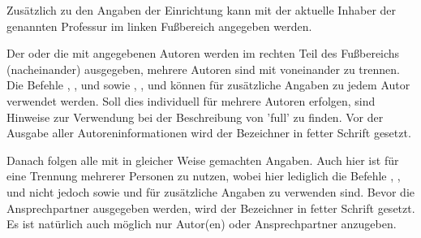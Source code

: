 \begin{DeclareEntity}{}
\begin{Declaration}
  {}
\printdeclarationlist

Zusätzlich zu den Angaben der Einrichtung kann mit  der 
aktuelle Inhaber der genannten Professur im linken Fußbereich angegeben werden.
\end{Declaration}

\begin{Declaration}
  {}
\begin{Declaration}
  {}
\begin{Declaration}
  {}
\begin{Declaration}
  {}
\begin{Declaration}
  {}
\begin{Declaration}
  {}
\begin{Declaration}
  {}
\begin{Declaration}
  {}
\printdeclarationlist

Der oder die mit  angegebenen Autoren werden im rechten Teil des 
Fußbereichs (nacheinander) ausgegeben, mehrere Autoren sind mit  
voneinander zu trennen. Die Befehle , , 
 und  sowie , , 
und  können für zusätzliche Angaben zu jedem Autor verwendet 
werden. Soll dies individuell für mehrere Autoren erfolgen, sind Hinweise zur 
Verwendung bei der Beschreibung von 'full' zu finden. Vor der 
Ausgabe aller Autoreninformationen wird der Bezeichner  in 
fetter Schrift gesetzt. 

Danach folgen alle mit  in gleicher Weise gemachten 
Angaben. Auch hier ist  für eine Trennung mehrerer Personen zu 
nutzen, wobei hier lediglich die Befehle , , 
 und  nicht jedoch  sowie 
 und  für zusätzliche Angaben zu verwenden 
sind. Bevor die Ansprechpartner ausgegeben werden, wird der Bezeichner 
 in fetter Schrift gesetzt. Es ist natürlich auch 
möglich nur Autor(en) oder Ansprechpartner anzugeben.
\end{Declaration}
\end{Declaration}
\end{Declaration}
\end{Declaration}
\end{Declaration}
\end{Declaration}
\end{Declaration}
\end{Declaration}


\end{DeclareEntity}
